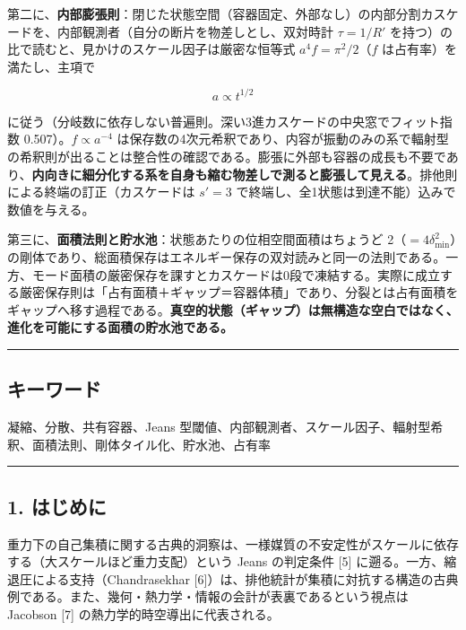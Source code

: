 \documentclass[
]{ltjsarticle}
\begin{document}
第二に、\textbf{内部膨張則}：閉じた状態空間（容器固定、外部なし）の内部分割カスケードを、内部観測者（自分の断片を物差しとし、双対時計
\(\tau=1/R'\) を持つ）の比で読むと、見かけのスケール因子は厳密な恒等式
\(a^4 f=\pi^2/2\)（\(f\) は占有率）を満たし、主項で

\[
a\propto t^{1/2}
\]

に従う（分岐数に依存しない普遍則。深い3進カスケードの中央窓でフィット指数
0.507）。\(f\propto a^{-4}\)
は保存数の4次元希釈であり、内容が振動のみの系で輻射型の希釈則が出ることは整合性の確認である。膨張に外部も容器の成長も不要であり、\textbf{内向きに細分化する系を自身も縮む物差しで測ると膨張して見える}。排他則による終端の訂正（カスケードは
\(s'=3\) で終端し、全1状態は到達不能）込みで数値を与える。

第三に、\textbf{面積法則と貯水池}：状態あたりの位相空間面積はちょうど
2（\(=4\delta_{\min}^2\)）の剛体であり、総面積保存はエネルギー保存の双対読みと同一の法則である。一方、モード面積の厳密保存を課すとカスケードは0段で凍結する。実際に成立する厳密保存則は「占有面積＋ギャップ＝容器体積」であり、分裂とは占有面積をギャップへ移す過程である。\textbf{真空的状態（ギャップ）は無構造な空白ではなく、進化を可能にする面積の貯水池である。}

\begin{center}\rule{0.5\linewidth}{0.5pt}\end{center}

\subsection{キーワード}\label{ux30adux30fcux30efux30fcux30c9}

凝縮、分散、共有容器、Jeans
型閾値、内部観測者、スケール因子、輻射型希釈、面積法則、剛体タイル化、貯水池、占有率

\begin{center}\rule{0.5\linewidth}{0.5pt}\end{center}

\subsection{1. はじめに}\label{ux306fux3058ux3081ux306b}

重力下の自己集積に関する古典的洞察は、一様媒質の不安定性がスケールに依存する（大スケールほど重力支配）という
Jeans の判定条件 {[}5{]} に遡る。一方、縮退圧による支持（Chandrasekhar
{[}6{]}）は、排他統計が集積に対抗する構造の古典例である。また、幾何・熱力学・情報の会計が表裏であるという視点は
Jacobson {[}7{]} の熱力学的時空導出に代表される。
\end{document}
